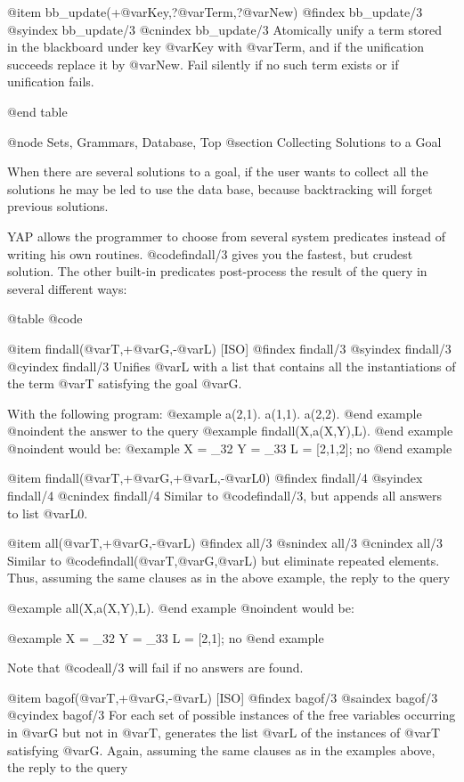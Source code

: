 {{{{{{@item bb_update(+@var{Key},?@var{Term},?@var{New})
@findex bb_update/3
@syindex bb_update/3
@cnindex bb_update/3
Atomically  unify a term stored in the blackboard under key @var{Key}
with @var{Term}, and if the unification succeeds replace it by
@var{New}. Fail silently if no such term exists or if unification fails.

@end table

@node Sets, Grammars, Database, Top
@section Collecting Solutions to a Goal

When there are several solutions to a goal, if the user wants to collect all
the solutions he may be led to use the data base, because backtracking will
forget previous solutions.

YAP allows the programmer to choose from several system
predicates instead of writing his own routines.  @code{findall/3} gives you
the fastest, but crudest solution. The other built-in predicates
post-process the result of the query in several different ways:

@table @code

@item findall(@var{T},+@var{G},-@var{L}) [ISO]
@findex findall/3
@syindex findall/3
@cyindex findall/3
Unifies @var{L} with a list that contains all the instantiations of the
term @var{T} satisfying the goal @var{G}.

With the following program:
@example
a(2,1).
a(1,1).
a(2,2).
@end example
@noindent
the answer to the query
@example
findall(X,a(X,Y),L).
@end example
@noindent
would be:
@example
X = _32
Y = _33
L = [2,1,2];
no
@end example

@item findall(@var{T},+@var{G},+@var{L},-@var{L0})
@findex findall/4
@syindex findall/4
@cnindex findall/4
Similar to @code{findall/3}, but appends all answers to list @var{L0}.

@item all(@var{T},+@var{G},-@var{L})
@findex all/3
@snindex all/3
@cnindex all/3
Similar to @code{findall(@var{T},@var{G},@var{L})} but eliminate
repeated elements. Thus, assuming the same clauses as in the above
example, the reply to the query

@example
all(X,a(X,Y),L).
@end example
@noindent
would be:

@example
X = _32
Y = _33
L = [2,1];
no
@end example

Note that @code{all/3} will fail if no answers are found.

@item bagof(@var{T},+@var{G},-@var{L}) [ISO]
@findex bagof/3
@saindex bagof/3
@cyindex bagof/3
For each set of possible instances of the free variables occurring in
@var{G} but not in @var{T}, generates the list @var{L} of the instances of
@var{T} satisfying @var{G}. Again, assuming the same clauses as in the
examples above, the reply to the query

}}}}}}
